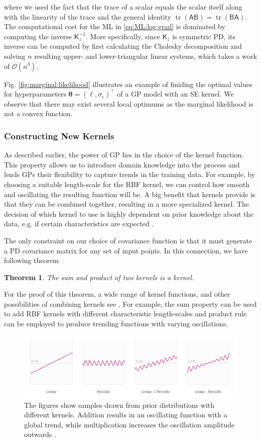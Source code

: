 \documentclass[10pt]{article}
\newtheorem{thm}{Theorem}[section]
\theoremstyle{definition}
\theoremstyle{definition}
\theoremstyle{remark}
\DeclareMathOperator{\tr}{tr}
\begin{document}
where we used the fact that the trace of a scalar equals the scalar itself along with the linearity of the trace and the general identity $\tr(\mathsf{A}\mathsf{B})=\tr(\mathsf{B}\mathsf{A})$. The computational cost for the ML in \eqref{eq:ML:log:grad} is dominated by computing the inverse $\mathsf{K}_z^{-1}$. More specifically, since $\mathsf{K}_z$ is symmetric PD, its inverse can be computed by first calculating the Cholesky decomposition and solving $n$ resulting upper- and lower-triangular linear systems, which takes a work of $\mathcal{O}(n^3)$.

Fig. \ref{fig:marginal:likelihood} illustrates an example of finiding the optimal values for hyperparameters $\boldsymbol{\theta}=(\ell, \sigma_{\epsilon})^{\top}$ of a GP model with an SE kernel. We observe that there may exist several local optimums as the marginal likelihood is not a convex function.

\subsubsection{Constructing New Kernels}
As described earlier, the power of GP lies in the choice of the kernel function. This property allows us to introduce domain knowledge into the process and lends GPs their flexibility to capture trends in the training data. For example, by choosing a suitable length-scale for the RBF kernel, we can control how smooth and oscillating the resulting function will be. A big benefit that kernels provide is that they can be combined together, resulting in a more specialized kernel. The decision of which kernel to use is highly dependent on prior knowledge about the data, e.g. if certain characteristics are expected \cite{Gortler2019}.

The only constraint on our choice of covariance function is that it must generate a PD covariance matrix for any set of input points. In this connection, we have following theorem
\begin{thm}
The sum and product of two kernels is a kernel.
\end{thm}
For the proof of this theorem, a wide range of kernel functions, and other possibilities of combining kernels see \cite[Section 4.2]{Rasmussen2006}. For example, the sum property can be used to add RBF kernels with different characteristic length-scales and product rule can be employed to produce trending functions with varying oscillations.
\begin{figure}[t!]
\centering
\includegraphics[width=17cm]{figs/combine-kernels.png}
\caption{The figures show samples drawn from prior distributions with different kernels. Addition results in an oscillating function with a global trend, while multiplication increases the oscillation amplitude outwards \cite{Gortler2019}.}
\label{fig:kernels:combine}
\end{figure}
\end{document}
